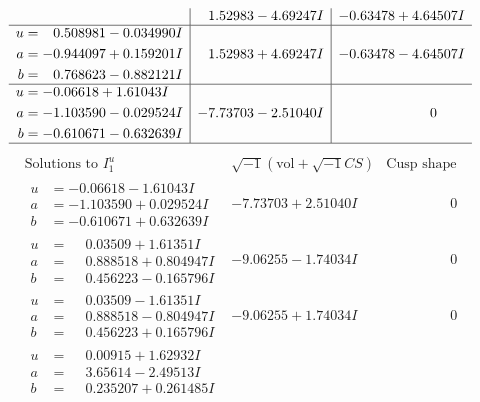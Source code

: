 \documentclass[1p]{elsarticle_modified}
\theoremstyle{definition}
\newcommand{\I}{\sqrt{-1}}
\begin{document}
$$\begin{array}{c|c|c}
 & \phantom{-}1.52983 - 4.69247 I & -0.63478 + 4.64507 I \\ \hline\begin{aligned}
u &= \phantom{-}0.508981 - 0.034990 I \\
a &= -0.944097 + 0.159201 I \\
b &= \phantom{-}0.768623 - 0.882121 I\end{aligned}
 & \phantom{-}1.52983 + 4.69247 I & -0.63478 - 4.64507 I \\ \hline\begin{aligned}
u &= -0.06618 + 1.61043 I \\
a &= -1.103590 - 0.029524 I \\
b &= -0.610671 - 0.632639 I\end{aligned}
 & -7.73703 - 2.51040 I & \phantom{-0.000000 } 0\\
 \hline 
 \end{array}$$\newpage$$\begin{array}{c|c|c}  
\text{Solutions to }I^u_{1}& \I (\text{vol} + \sqrt{-1}CS) & \text{Cusp shape}\\
 \hline 
\begin{aligned}
u &= -0.06618 - 1.61043 I \\
a &= -1.103590 + 0.029524 I \\
b &= -0.610671 + 0.632639 I\end{aligned}
 & -7.73703 + 2.51040 I & \phantom{-0.000000 } 0 \\ \hline\begin{aligned}
u &= \phantom{-}0.03509 + 1.61351 I \\
a &= \phantom{-}0.888518 + 0.804947 I \\
b &= \phantom{-}0.456223 - 0.165796 I\end{aligned}
 & -9.06255 - 1.74034 I & \phantom{-0.000000 } 0 \\ \hline\begin{aligned}
u &= \phantom{-}0.03509 - 1.61351 I \\
a &= \phantom{-}0.888518 - 0.804947 I \\
b &= \phantom{-}0.456223 + 0.165796 I\end{aligned}
 & -9.06255 + 1.74034 I & \phantom{-0.000000 } 0 \\ \hline\begin{aligned}
u &= \phantom{-}0.00915 + 1.62932 I \\
a &= \phantom{-}3.65614 - 2.49513 I \\
b &= \phantom{-}0.235207 + 0.261485 I\end{aligned}

\end{array}$$
\end{document}
